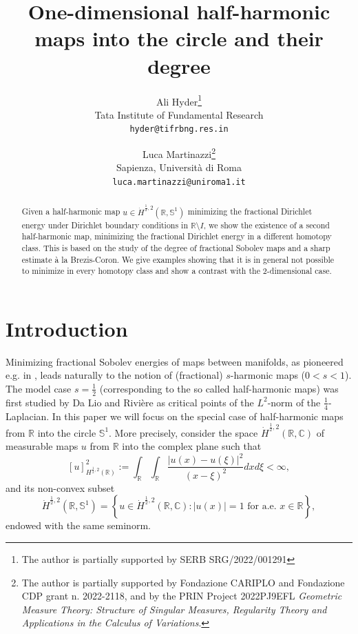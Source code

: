\documentclass[12pt, a4paper]{article}
\author{Ali Hyder\thanks{The author is partially supported by SERB SRG/2022/001291} \\ {\small Tata Institute of Fundamental Research}\\ {\small \texttt{hyder@tifrbng.res.in}} \and Luca Martinazzi\thanks{The author is partially supported by Fondazione CARIPLO and Fondazione CDP grant n. 2022-2118, and by the PRIN Project 2022PJ9EFL \emph{Geometric Measure Theory: Structure of Singular Measures, Regularity Theory and Applications in the Calculus of Variations}.}\\  {\small Sapienza, Universit\`a di Roma} \\ {\small \texttt{luca.martinazzi@uniroma1.it}}}
\title{One-dimensional half-harmonic maps into the circle and their degree}
\newcommand{\sph}{\mathbb{S}}
\newcommand{\vp}{\varphi}
\newcommand{\R}{\mathbb{R}}
\newcommand{\blu}[1]{{\color{blue}#1}}
\newcommand{\red}[1]{{\color{red}#1}}
\renewcommand{\(}{\left(}
\renewcommand{\)}{\right)}
\begin{document}
\maketitle

\begin{abstract}
Given a half-harmonic map $u\in \dot H^{\frac{1}{2},2}(\R,\sph^1)$ minimizing the fractional Dirichlet energy under Dirichlet boundary conditions in $\R\setminus I$, we show the existence of a second half-harmonic map, minimizing the fractional Dirichlet energy in a different homotopy class. This is based on the study of the degree of fractional Sobolev maps and a sharp estimate \`a la Brezis-Coron. We give examples showing that it is in general not possible to minimize in every homotopy class and show a contrast with the 2-dimensional case.
\end{abstract}

 

\section{Introduction}
Minimizing fractional Sobolev energies of maps between manifolds, as pioneered e.g. in \cite{mirpis}, leads naturally to the notion of (fractional) $s$-harmonic maps ($0<s<1$). The model case $s=\frac12$ (corresponding to the so called half-harmonic maps) was first studied by Da Lio and Rivi\`ere \cite{DLR,DLR2} as critical points of the $L^2$-norm of the $\tfrac14$-Laplacian. In this paper we will focus on the special case of half-harmonic maps from $\R$ into the circle $\sph^1$. More precisely, consider the space $\dot H^{\frac12,2}(\R, \mathbb{C})$ of measurable maps $u$ from $\R$ into the complex plane  such that 
$$[u]_{H^{\frac{1}{2},2}(\R)}^2:= \int_{\R}\int_{\R}\frac{|u(x)-u(\xi)|^2}{(x-\xi)^2}dxd\xi<\infty,$$
and its non-convex subset
$$\dot H^{\frac12,2}(\R, \sph^1) = \left\{u\in \dot H^{\frac12,2}(\R, \mathbb{C}): |u(x)|=1 \text{ for a.e. }x\in\R\right\},$$
endowed with the same seminorm. 
\end{document}
